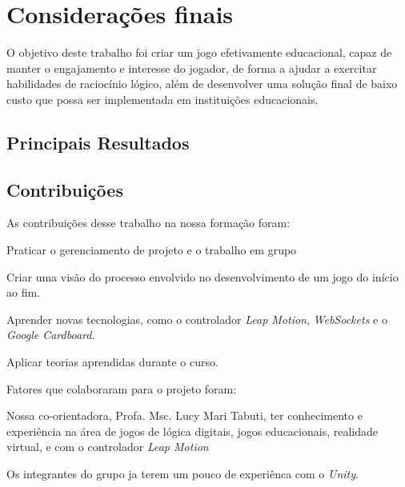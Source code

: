 
\chapter{Considerações finais}\label{cap-consideracoes-finais}

O objetivo deste trabalho foi criar um jogo efetivamente educacional, capaz de manter o engajamento e interesse do jogador, de forma a ajudar a exercitar habilidades de raciocínio lógico, além de desenvolver uma solução final de baixo custo que possa ser implementada em instituições educacionais.

\section{Principais Resultados}\label{sec-conc-resultados}


\section{Contribuições}\label{sec-conc-contribuicoes}

As contribuições desse trabalho na nossa formação foram:

\begin{alineas}
	\item Praticar o gerenciamento de projeto e o trabalho em grupo
	\item Criar uma visão do processo envolvido no desenvolvimento de um jogo do início ao fim.
	\item Aprender novas tecnologias, como o controlador \textit{Leap Motion}, \textit{WebSockets} e o \textit{Google Cardboard}.
	\item Aplicar teorias aprendidas durante o curso.
\end{alineas}

Fatores que colaboraram para o projeto foram:

\begin{alineas}
	\item Nossa co-orientadora, Profa. Msc. Lucy Mari Tabuti, ter conhecimento e experiência na área de jogos de lógica digitais, jogos educacionais, realidade virtual, e com o controlador \textit{Leap Motion}
	\item Os integrantes do grupo ja terem um pouco de experiênca com o \textit{Unity}.
\end{alineas}

